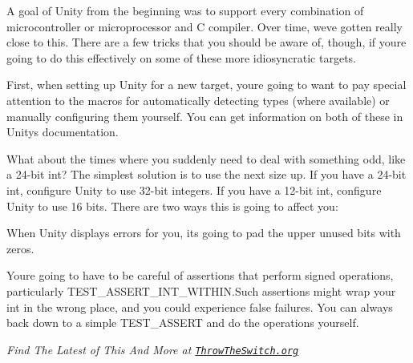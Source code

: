 A goal of Unity from the beginning was to support every combination of microcontroller or microprocessor and C compiler. Over time, we\textquotesingle{}ve gotten really close to this. There are a few tricks that you should be aware of, though, if you\textquotesingle{}re going to do this effectively on some of these more idiosyncratic targets.

First, when setting up Unity for a new target, you\textquotesingle{}re going to want to pay special attention to the macros for automatically detecting types (where available) or manually configuring them yourself. You can get information on both of these in Unity\textquotesingle{}s documentation.

What about the times where you suddenly need to deal with something odd, like a 24-\/bit {\ttfamily int}? The simplest solution is to use the next size up. If you have a 24-\/bit {\ttfamily int}, configure Unity to use 32-\/bit integers. If you have a 12-\/bit {\ttfamily int}, configure Unity to use 16 bits. There are two ways this is going to affect you\+:


\begin{DoxyEnumerate}
\item When Unity displays errors for you, it\textquotesingle{}s going to pad the upper unused bits with zeros.
\item You\textquotesingle{}re going to have to be careful of assertions that perform signed operations, particularly {\ttfamily T\+E\+S\+T\+\_\+\+A\+S\+S\+E\+R\+T\+\_\+\+I\+N\+T\+\_\+\+W\+I\+T\+H\+IN}.Such assertions might wrap your {\ttfamily int} in the wrong place, and you could experience false failures. You can always back down to a simple {\ttfamily T\+E\+S\+T\+\_\+\+A\+S\+S\+E\+RT} and do the operations yourself.
\end{DoxyEnumerate}

{\itshape Find The Latest of This And More at \href{https://throwtheswitch.org}{\tt Throw\+The\+Switch.\+org}} 